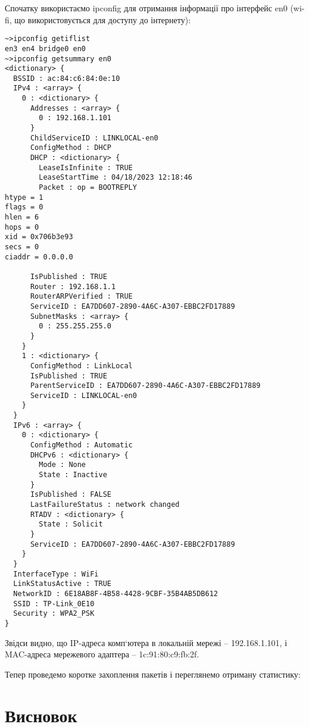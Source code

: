 \documentclass[12 pt, a4paper]{article}
\begin{document}
Спочатку використаємо ipconfig для отримання інформації про інтерфейс en0
(wi-fi, що використовується для доступу до інтернету):

\begin{verbatim}
~>ipconfig getiflist
en3 en4 bridge0 en0
~>ipconfig getsummary en0
<dictionary> {
  BSSID : ac:84:c6:84:0e:10
  IPv4 : <array> {
    0 : <dictionary> {
      Addresses : <array> {
        0 : 192.168.1.101
      }
      ChildServiceID : LINKLOCAL-en0
      ConfigMethod : DHCP
      DHCP : <dictionary> {
        LeaseIsInfinite : TRUE
        LeaseStartTime : 04/18/2023 12:18:46
        Packet : op = BOOTREPLY
htype = 1
flags = 0
hlen = 6
hops = 0
xid = 0x706b3e93
secs = 0
ciaddr = 0.0.0.0

      IsPublished : TRUE
      Router : 192.168.1.1
      RouterARPVerified : TRUE
      ServiceID : EA7DD607-2890-4A6C-A307-EBBC2FD17889
      SubnetMasks : <array> {
        0 : 255.255.255.0
      }
    }
    1 : <dictionary> {
      ConfigMethod : LinkLocal
      IsPublished : TRUE
      ParentServiceID : EA7DD607-2890-4A6C-A307-EBBC2FD17889
      ServiceID : LINKLOCAL-en0
    }
  }
  IPv6 : <array> {
    0 : <dictionary> {
      ConfigMethod : Automatic
      DHCPv6 : <dictionary> {
        Mode : None
        State : Inactive
      }
      IsPublished : FALSE
      LastFailureStatus : network changed
      RTADV : <dictionary> {
        State : Solicit
      }
      ServiceID : EA7DD607-2890-4A6C-A307-EBBC2FD17889
    }
  }
  InterfaceType : WiFi
  LinkStatusActive : TRUE
  NetworkID : 6E18AB8F-4B58-4428-9CBF-35B4AB5DB612
  SSID : TP-Link_0E10
  Security : WPA2_PSK
}
\end{verbatim}

Звідси видно, що IP-адреса комп‘ютера в локальній мережі –  192.168.1.101, і MAC-адреса мережевого адаптера – 1c:91:80:c9:fb:2f.

Тепер проведемо коротке захоплення пакетів і переглянемо отриману статистику:



\section*{Висновок}
\end{document}
